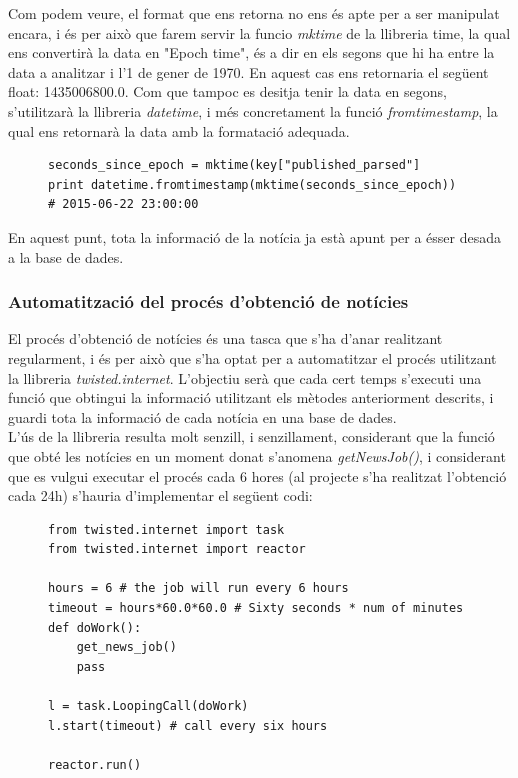 \documentclass[12pt,a4paper,openright,oneside]{article}
\numberwithin{equation}{section}
\theoremstyle{definition}
\begin{document}
Com podem veure, el format que ens retorna no ens és apte per a ser manipulat encara, i és per això que farem servir la funcio \emph{mktime} de la llibreria time, la qual ens convertirà la data en "Epoch time", és a dir en els segons que hi ha entre la data a analitzar i l'1 de gener de 1970. En aquest cas ens retornaria el següent float: 1435006800.0. Com que tampoc es desitja tenir la data en segons, s'utilitzarà la llibreria \emph{datetime}, i més concretament la funció \emph{fromtimestamp}, la qual ens retornarà la data amb la formatació adequada\cite{time}. 

\begin{figure}[!htbp]
\begin{verbatim}
seconds_since_epoch = mktime(key["published_parsed"]
print datetime.fromtimestamp(mktime(seconds_since_epoch))
# 2015-06-22 23:00:00
\end{verbatim}
\end{figure}

En aquest punt, tota la informació de la notícia ja està apunt per a ésser desada a la base de dades.
\subsubsection*{Automatització del procés d'obtenció de notícies}
El procés d'obtenció de notícies és una tasca que s'ha d'anar realitzant regularment, i és per això que s'ha optat per a automatitzar el procés utilitzant la llibreria \emph{twisted.internet}. L'objectiu serà que cada cert temps s'executi una funció que obtingui la informació utilitzant els mètodes anteriorment descrits, i guardi tota la informació de cada notícia en una base de dades.\\
L'ús de la llibreria resulta molt senzill, i senzillament, considerant que la funció que obté les notícies en un moment donat s'anomena \emph{getNewsJob()}, i considerant que es vulgui executar el procés cada 6 hores (al projecte s'ha realitzat l'obtenció cada 24h) s'hauria d'implementar el següent codi:
\newpage
\begin{figure}[!htbp]
\begin{verbatim}
from twisted.internet import task
from twisted.internet import reactor

hours = 6 # the job will run every 6 hours
timeout = hours*60.0*60.0 # Sixty seconds * num of minutes
def doWork():
    get_news_job()
    pass

l = task.LoopingCall(doWork)
l.start(timeout) # call every six hours

reactor.run()
\end{verbatim}
\end{figure}
\end{document}
